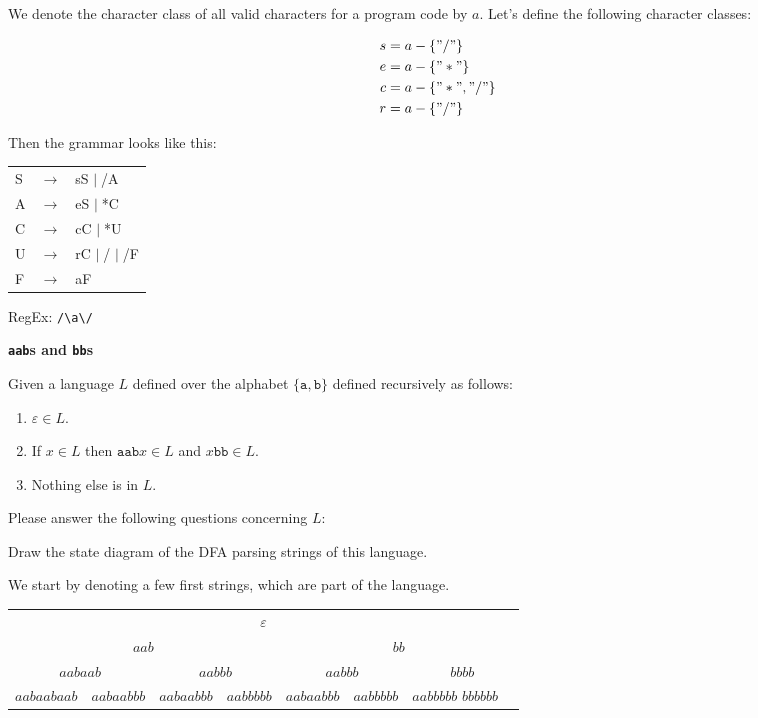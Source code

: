 \documentclass[a4paper]{exam}
\theoremstyle{remark}
\newenvironment{grammar}
	{\begin{tabular}[b]{lcl}}
	{\end{tabular}}
\newcommand{\rewritten}{$\to$}
\newcommand{\alternative}{$\mid \;$}
\begin{document}
\begin{questions}
\begin{otherlanguage}{german}
\end{otherlanguage}

\begin{solution}
	We denote the character class of all valid characters for a program code by $a$. Let's define the following character classes:
	
	\begin{align}
		s &= a - \{"/"\} \\
		e & = a - \{"*"\} \\
		c &= a - \{"*", "/"\} \\
		r &= a - \{"/"\}
	\end{align}

	Then the grammar looks like this:

	\begin{grammar}
		S & \rewritten & sS \alternative /A \\
		A & \rewritten & eS \alternative *C \\
		C & \rewritten & cC \alternative *U \\
		U & \rewritten & rC \alternative / \alternative /F \\
		F & \rewritten & aF
	\end{grammar}
	
	RegEx: {\tt /\textbackslash*a\textbackslash*/}
\end{solution}

\question
	\textbf{\texttt{aab}s and \texttt{bb}s}
	
	Given a language $L$ defined over the alphabet $\{\mathtt{a}, \mathtt{b}\}$ defined recursively as follows:
	\begin{enumerate}
		\item $\varepsilon \in L$.
		\item If $x \in L$ then $\mathtt{aab}x \in L$ and $x\mathtt{bb} \in L$.
		\item Nothing else is in $L$.
	\end{enumerate}
	
	Please answer the following questions concerning $L$:
	\begin{parts}
		\item Draw the state diagram of the DFA parsing strings of this language.
		\begin{solution}
			We start by denoting a few first strings, which are part of the language.
			
			\begin{tabular}{cccccccc}
				\multicolumn{8}{c}{$\varepsilon$} \\
				\multicolumn{4}{c}{$aab$} & \multicolumn{4}{c}{$bb$} \\
				\multicolumn{2}{c}{$aabaab$} & \multicolumn{2}{c}{$aabbb$} & \multicolumn{2}{c}{$aabbb$} & \multicolumn{2}{c}{$bbbb$} \\
				$aabaabaab$ & $aabaabbb$ & $aabaabbb$ & $aabbbbb$ & $aabaabbb$ & $aabbbbb$ & $aabbbbb$ $bbbbbb$ 
			\end{tabular}
			

\end{solution}
\end{parts}
\end{questions}
\end{document}

